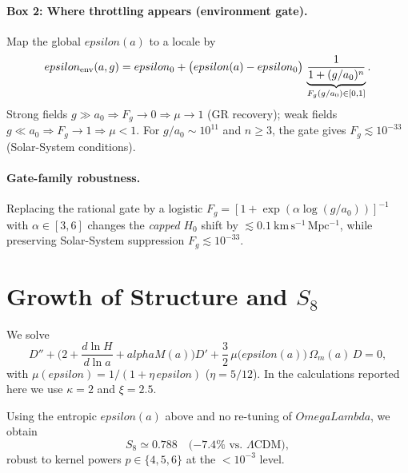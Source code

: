 \documentclass[aps,prd,onecolumn,superscriptaddress,nofootinbib]{revtex4-2}
\def\OmL{OmegaLambda}%
\def\alphaM{alphaM}%
\def\eps{epsilon}%
\newcommand{\OmL}{\Omega_\Lambda}
\newcommand{\alphaM}{\alpha_M}
\newcommand{\eps}{\varepsilon}
\begin{document}
\paragraph*{Box 2: Where throttling appears (environment gate).}
Map the global $\eps(a)$ to a locale by
\begin{equation}
\eps_{\rm env}(a,g)=\eps_0+\big(\eps(a)-\eps_0\big)\,\underbrace{\frac{1}{1+(g/a_0)^n}}_{F_g(g/a_0)\in[0,1]} .
\end{equation}
Strong fields $g\gg a_0\Rightarrow F_g\to 0\Rightarrow \mu\to 1$ (GR recovery); weak fields $g\ll a_0\Rightarrow F_g\to 1\Rightarrow \mu<1$. For $g/a_0\sim 10^{11}$ and $n\ge 3$, the gate gives $F_g\lesssim 10^{-33}$ (Solar-System conditions).

\paragraph*{Gate-family robustness.}
Replacing the rational gate by a logistic \(F_g=[1+\exp(\alpha\log(g/a_0))]^{-1}\) with \(\alpha\in[3,6]\) changes the \emph{capped} $H_0$ shift by $\lesssim 0.1\ \mathrm{km\,s^{-1}\,Mpc^{-1}}$, while preserving Solar-System suppression \(F_g\lesssim 10^{-33}\).

\section{Growth of Structure and \texorpdfstring{$S_8$}{S8}}
\label{sec:growth}
We solve
\begin{equation}
D''+\Big(2+\frac{d\ln H}{d\ln a}+\alphaM(a)\Big)D' + \frac{3}{2}\,\mu\big(\eps(a)\big)\,\Omega_m(a)\,D=0,
\end{equation}
with $\mu(\eps)=1/(1+\eta\,\eps)$ ($\eta=5/12$). In the calculations reported here we use \(\kappa=2\) and \(\xi=2.5\).

Using the entropic $\eps(a)$ above and no re-tuning of $\OmL$, we obtain
\begin{equation}
S_8\simeq 0.788\quad \text{($-7.4\%$ vs.\ $\Lambda$CDM)},
\end{equation}
robust to kernel powers $p\in\{4,5,6\}$ at the $<10^{-3}$ level.

\end{document}
